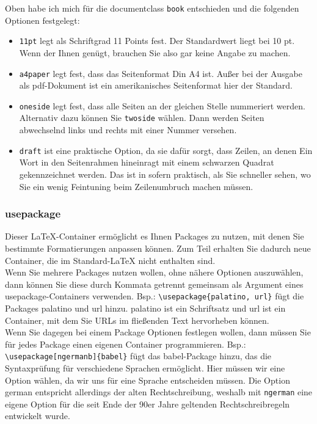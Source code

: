 Oben habe ich mich für die documentclass \verb|book| entschieden und die folgenden Optionen festgelegt:

\begin{itemize}
	\item \verb|11pt| legt als Schriftgrad 11 Points fest. Der Standardwert liegt bei 10 pt. Wenn der Ihnen genügt, brauchen Sie also gar keine Angabe zu machen.
	\item \verb|a4paper| legt fest, dass das Seitenformat Din A4 ist. Außer bei der Ausgabe als pdf-Dokument ist ein amerikanisches Seitenformat hier der Standard.
	\item \verb|oneside| legt fest, dass alle Seiten an der gleichen Stelle nummeriert werden. Alternativ dazu können Sie \verb|twoside| wählen. Dann werden Seiten abwechselnd links und rechts mit einer Nummer versehen.
	\item \verb|draft| ist eine praktische Option, da sie dafür sorgt, dass Zeilen, an denen Ein Wort in den Seitenrahmen hineinragt mit einem schwarzen Quadrat gekennzeichnet werden. Das ist in sofern praktisch, als Sie schneller sehen, wo Sie ein wenig Feintuning beim Zeilenumbruch machen müssen.
\end{itemize}

\subsubsection{usepackage}

Dieser LaTeX-Container ermöglicht es Ihnen Packages zu nutzen, mit denen Sie bestimmte Formatierungen anpassen können. Zum Teil erhalten Sie dadurch neue Container, die im \glqq{}Standard-\grqq{}LaTeX nicht enthalten sind.\\

Wenn Sie mehrere Packages nutzen wollen, ohne nähere Optionen auszuwählen, dann können Sie diese durch Kommata getrennt gemeinsam als Argument eines usepackage-Containers verwenden. Bsp.: \verb|\usepackage{palatino, url}| fügt die Packages palatino und url hinzu. palatino ist ein Schriftsatz und url ist ein Container, mit dem Sie URLs im fließenden Text hervorheben können.\\

Wenn Sie dagegen bei einem Package Optionen festlegen wollen, dann müssen Sie für jedes Package einen eigenen Container programmieren. Bsp.: \verb|\usepackage[ngermanb]{babel}| fügt das babel-Package hinzu, das die Syntaxprüfung für verschiedene Sprachen ermöglicht. Hier müssen wir eine Option wählen, da wir uns für eine Sprache entscheiden müssen. Die Option german entspricht allerdings der alten Rechtschreibung, weshalb mit \verb|ngerman| eine eigene Option für die seit Ende der 90er Jahre geltenden Rechtschreibregeln entwickelt wurde.\\

